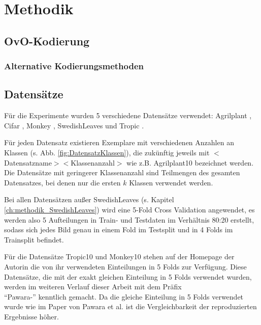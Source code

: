 \chapter{Methodik}
\label{ch:methodik}

\section{OvO-Kodierung}
\label{ch:methodik_kodierung}

\subsection{Alternative Kodierungsmethoden}

\newpage
\section{Datensätze}
\label{ch:methodik_datensaetze}
Für die Experimente wurden 5 verschiedene Datensätze verwendet: Agrilplant \cite{pawaraWebsiteDatensaetze}, Cifar \cite{cifar10}, Monkey \cite{pawaraWebsiteDatensaetze}, SwedishLeaves \cite{swedishLeaves} und Tropic \cite{pawaraWebsiteDatensaetze}.

Für jeden Datensatz existieren Exemplare mit verschiedenen Anzahlen an Klassen (s. Abb. \ref{fig:DatensatzKlassen}), die zukünftig jeweils mit $<$Datensatzname$><$Klassenanzahl$>$ wie z.B. Agrilplant10 bezeichnet werden.
Die Datensätze mit geringerer Klassenanzahl sind Teilmengen des gesamten Datensatzes, bei denen nur die ersten $k$ Klassen verwendet werden.

Bei allen Datensätzen außer SwedishLeaves (s. Kapitel \ref{ch:methodik_SwedishLeaves}) wird eine 5-Fold Cross Validation angewendet, es werden also 5 Aufteilungen in Train- und Testdaten im Verhältnis 80:20 erstellt, sodass sich jedes Bild genau in einem Fold im Testsplit und in 4 Folds im Trainsplit befindet.

Für die Datensätze Tropic10 und Monkey10 stehen auf der Homepage der Autorin \cite{pawaraWebsiteDatensaetze} die von ihr verwendeten Einteilungen in 5 Folds zur Verfügung. Diese Datensätze, die mit der exakt gleichen Einteilung in 5 Folds verwendet wurden, werden im weiteren Verlauf dieser Arbeit mit dem Präfix\\ \enquote{Pawara-} kenntlich gemacht. Da die gleiche Einteilung in 5 Folds verwendet wurde wie im Paper von Pawara et al. \cite{pawaraPaper} ist die Vergleichbarkeit der reproduzierten Ergebnisse höher.

